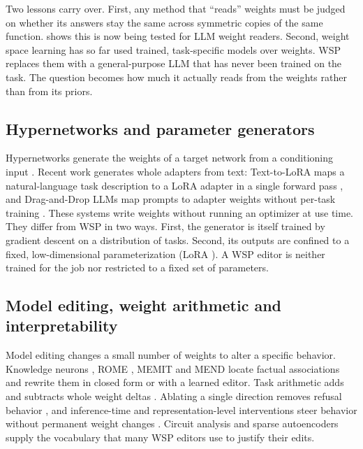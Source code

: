Two lessons carry over. First, any method that ``reads'' weights must be judged on whether its answers stay the same across symmetric copies of the same function.  shows this is now being tested for LLM weight readers. Second, weight space learning has so far used trained, task-specific models over weights. WSP replaces them with a general-purpose LLM that has never been trained on the task. The question becomes how much it actually reads from the weights rather than from its priors.

\subsection{Hypernetworks and parameter generators}

Hypernetworks generate the weights of a target network from a conditioning input \citep{ax1609_09106}. Recent work generates whole adapters from text: Text-to-LoRA maps a natural-language task description to a LoRA adapter in a single forward pass \citep{ax2506_06105}, and Drag-and-Drop LLMs map prompts to adapter weights without per-task training \citep{ax2506_16406}. These systems write weights without running an optimizer at use time. They differ from WSP in two ways. First, the generator is itself trained by gradient descent on a distribution of tasks. Second, its outputs are confined to a fixed, low-dimensional parameterization (LoRA \citep{ax2106_09685}). A WSP editor is neither trained for the job nor restricted to a fixed set of parameters.

\subsection{Model editing, weight arithmetic and interpretability}

Model editing changes a small number of weights to alter a specific behavior. Knowledge neurons \citep{ax2104_08696}, ROME \citep{ax2202_05262}, MEMIT \citep{ax2210_07229} and MEND \citep{ax2110_11309} locate factual associations and rewrite them in closed form or with a learned editor. Task arithmetic adds and subtracts whole weight deltas \citep{ax2212_04089}. Ablating a single direction removes refusal behavior \citep{ax2406_11717}, and inference-time and representation-level interventions steer behavior without permanent weight changes \citep{ax2306_03341,ax2310_01405}. Circuit analysis \citep{ax2211_00593} and sparse autoencoders \citep{ax2309_08600} supply the vocabulary that many WSP editors use to justify their edits.

